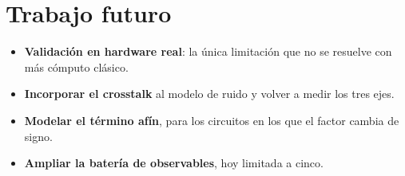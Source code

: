 \section{Trabajo futuro}
\label{sec:futuro}

\begin{itemize}
    \item \textbf{Validación en hardware real}: la única limitación que no se resuelve con más
          cómputo clásico.
    \item \textbf{Incorporar el crosstalk} al modelo de ruido y volver a medir los tres ejes.
    \item \textbf{Modelar el término afín}, para los circuitos en los que el factor cambia de signo.
    \item \textbf{Ampliar la batería de observables}, hoy limitada a cinco.
\end{itemize}
